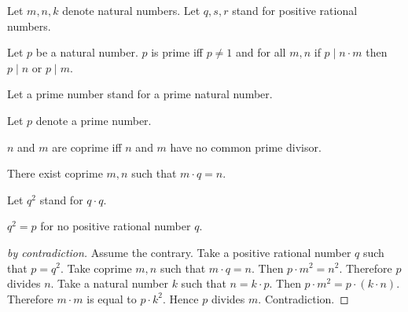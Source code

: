 \documentclass[english]{article}
\begin{document}
  \begin{forthel}
    Let $m, n, k$ denote natural numbers.
    Let $q, s, r$ stand for positive rational numbers.

    \begin{definition}
      Let $p$ be a natural number.
      $p$ is prime iff $p\neq 1$ and for all $m, n$
      if $p\mid n\cdot m$ then $p \mid n$ or $p \mid m$.
    \end{definition}

    Let a prime number stand for a prime natural number.

    Let $p$ denote a prime number.

    \begin{definition}
      $n$ and $m$ are coprime iff $n$ and $m$ have no common prime divisor.
    \end{definition}

    \begin{axiom}
      There exist coprime $m,n$ such that $m \cdot q = n$.
    \end{axiom}

    Let $q^{2}$ stand for $q \cdot q$.

    \begin{proposition}
      $q^{2} = p$ for no positive rational number $q$.
    \end{proposition}
    \begin{proof}[by contradiction]
      Assume the contrary.
      Take a positive rational number $q$ such that $p = q^{2}$.
      Take coprime $m,n$ such that $m \cdot q = n$.
      Then $p \cdot m^{2} = n^{2}$.
      Therefore $p$ divides $n$.
      Take a natural number $k$ such that $n = k \cdot p$.
      Then $p \cdot m^{2} = p \cdot (k \cdot n)$.
      Therefore $m \cdot m$ is equal to $p \cdot k^{2}$.
      Hence $p$ divides $m$.
      Contradiction.
    \end{proof}
  \end{forthel}
\end{document}
